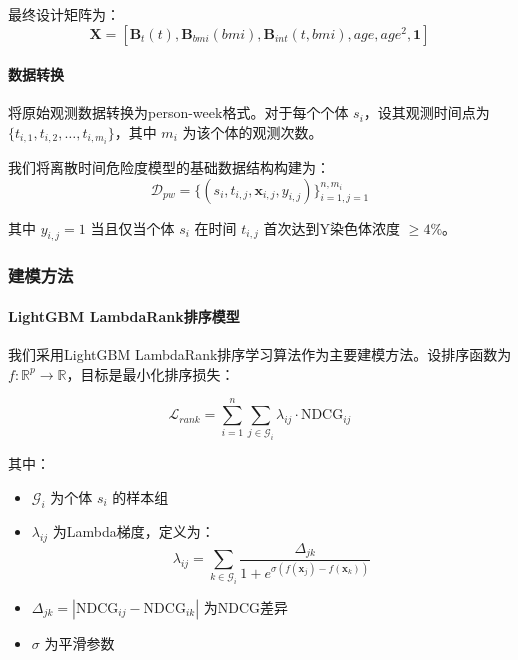 \documentclass[12pt,a4paper]{ctexart}
\numberwithin{equation}{section}
\theoremstyle{mcm}
\begin{document}
最终设计矩阵为：
$$\mathbf{X} = [\mathbf{B}_t(t), \mathbf{B}_{bmi}(bmi), \mathbf{B}_{int}(t, bmi), age, age^2, \mathbf{1}]$$

\paragraph{数据转换}

将原始观测数据转换为person-week格式。对于每个个体 $s_i$，设其观测时间点为 $\{t_{i,1}, t_{i,2}, \ldots, t_{i,m_i}\}$，其中 $m_i$ 为该个体的观测次数。

我们将离散时间危险度模型的基础数据结构构建为：
$$\mathcal{D}_{pw} = \{(s_i, t_{i,j}, \mathbf{x}_{i,j}, y_{i,j})\}_{i=1,j=1}^{n,m_i}$$

其中 $y_{i,j} = 1$ 当且仅当个体 $s_i$ 在时间 $t_{i,j}$ 首次达到Y染色体浓度 $\geq 4\%$。

\subsubsection{建模方法}

\paragraph{LightGBM LambdaRank排序模型}

我们采用LightGBM LambdaRank排序学习算法作为主要建模方法。设排序函数为 $f: \mathbb{R}^p \rightarrow \mathbb{R}$，目标是最小化排序损失：

$$\mathcal{L}_{rank} = \sum_{i=1}^n \sum_{j \in \mathcal{G}_i} \lambda_{ij} \cdot \text{NDCG}_{ij}$$

其中：
\begin{itemize}
\item $\mathcal{G}_i$ 为个体 $s_i$ 的样本组
\item $\lambda_{ij}$ 为Lambda梯度，定义为：
  $$\lambda_{ij} = \sum_{k \in \mathcal{G}_i} \frac{\Delta_{jk}}{1 + e^{\sigma(f(\mathbf{x}_j) - f(\mathbf{x}_k))}}$$
\item $\Delta_{jk} = |\text{NDCG}_{ij} - \text{NDCG}_{ik}|$ 为NDCG差异
\item $\sigma$ 为平滑参数
\end{itemize}


\end{document}
